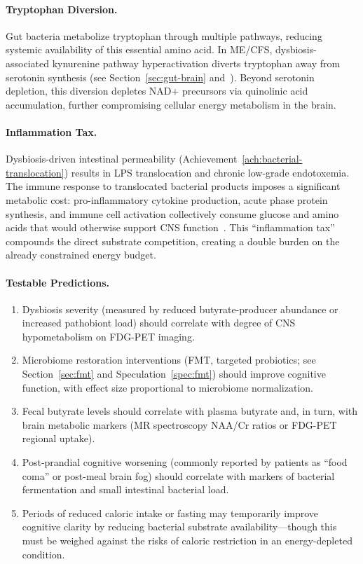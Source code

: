 \begin{speculation}
\paragraph{Tryptophan Diversion.}
Gut bacteria metabolize tryptophan through multiple pathways, reducing systemic availability of this essential amino acid. In ME/CFS, dysbiosis-associated kynurenine pathway hyperactivation diverts tryptophan away from serotonin synthesis (see Section~\ref{sec:gut-brain} and~\cite{Kavyani2022kynurenine,Abujrais2024tryptophan}). Beyond serotonin depletion, this diversion depletes NAD+ precursors via quinolinic acid accumulation, further compromising cellular energy metabolism in the brain.

\paragraph{Inflammation Tax.}
Dysbiosis-driven intestinal permeability (Achievement~\ref{ach:bacterial-translocation}) results in LPS translocation and chronic low-grade endotoxemia. The immune response to translocated bacterial products imposes a significant metabolic cost: pro-inflammatory cytokine production, acute phase protein synthesis, and immune cell activation collectively consume glucose and amino acids that would otherwise support CNS function~\cite{ElSehrawy2025gutbrain}. This ``inflammation tax'' compounds the direct substrate competition, creating a double burden on the already constrained energy budget.

\paragraph{Testable Predictions.}
\begin{enumerate}
    \item Dysbiosis severity (measured by reduced butyrate-producer abundance or increased pathobiont load) should correlate with degree of CNS hypometabolism on FDG-PET imaging.
    \item Microbiome restoration interventions (FMT, targeted probiotics; see Section~\ref{sec:fmt} and Speculation~\ref{spec:fmt}) should improve cognitive function, with effect size proportional to microbiome normalization.
    \item Fecal butyrate levels should correlate with plasma butyrate and, in turn, with brain metabolic markers (MR spectroscopy NAA/Cr ratios or FDG-PET regional uptake).
    \item Post-prandial cognitive worsening (commonly reported by patients as ``food coma'' or post-meal brain fog) should correlate with markers of bacterial fermentation and small intestinal bacterial load.
    \item Periods of reduced caloric intake or fasting may temporarily improve cognitive clarity by reducing bacterial substrate availability---though this must be weighed against the risks of caloric restriction in an energy-depleted condition.
\end{enumerate}


\end{speculation}
